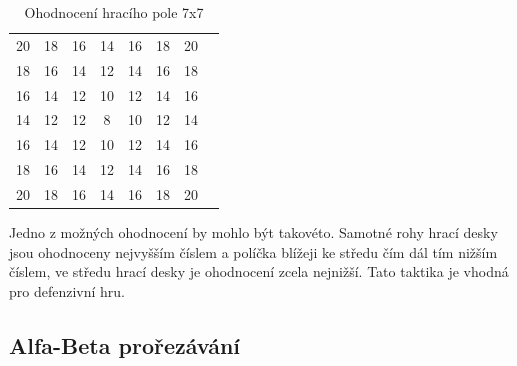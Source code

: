 \documentclass[
12pt,
a4paper,
pdftex,
czech,
titlepage
]{report}
\begin{document}
\begin{table}[th]
    \centering
    \begin{tabular}{cccccccc}
        \cellcolor{red!100} 20 &
        \cellcolor{red!60} 18 & 
        \cellcolor{red!50} 16 &
        \cellcolor{red!40} 14 &
        \cellcolor{red!50} 16 &
        \cellcolor{red!60} 18 &
        \cellcolor{red!100} 20 \\
        \cellcolor{red!60} 18 &
        \cellcolor{red!50} 16 &
        \cellcolor{red!40} 14 &
        \cellcolor{red!30} 12 &
        \cellcolor{red!40} 14 &
        \cellcolor{red!50} 16 &
        \cellcolor{red!60} 18 \\
        \cellcolor{red!50} 16 &
        \cellcolor{red!40} 14 &
        \cellcolor{red!30} 12 &
        \cellcolor{red!20} 10 &
        \cellcolor{red!30} 12 &
        \cellcolor{red!40} 14 &
        \cellcolor{red!50} 16 \\
        \cellcolor{red!40} 14 &
        \cellcolor{red!30} 12 &
        \cellcolor{red!30} 12 &
        \cellcolor{red!10} 8 &
        \cellcolor{red!20} 10 &
        \cellcolor{red!30} 12 &
        \cellcolor{red!40} 14 \\
        \cellcolor{red!50} 16 &
        \cellcolor{red!40} 14 &
        \cellcolor{red!30} 12 &
        \cellcolor{red!20} 10 &
        \cellcolor{red!30} 12 &
        \cellcolor{red!40} 14 &
        \cellcolor{red!50} 16 \\
        \cellcolor{red!60} 18 &
        \cellcolor{red!50} 16 &
        \cellcolor{red!40} 14 &
        \cellcolor{red!30} 12 &
        \cellcolor{red!40} 14 &
        \cellcolor{red!50} 16 &
        \cellcolor{red!60} 18 \\
        \cellcolor{red!100} 20 &
        \cellcolor{red!60} 18 & 
        \cellcolor{red!50} 16 &
        \cellcolor{red!40} 14 &
        \cellcolor{red!50} 16 &
        \cellcolor{red!60} 18 &
        \cellcolor{red!100} 20 \\
    \end{tabular}
    \caption{Ohodnocení hracího pole 7x7}
    \label{tab:my_label}
\end{table}

Jedno z možných ohodnocení by mohlo být takovéto. Samotné rohy hrací desky jsou ohodnoceny nejvyšším číslem a políčka blížeji ke středu čím dál tím nižším číslem, ve středu hrací desky je ohodnocení zcela nejnižší.
Tato taktika je vhodná pro defenzivní hru.

\subsection{Alfa-Beta prořezávání}
\end{document}
